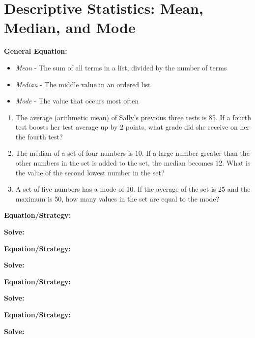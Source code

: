 \section{Descriptive Statistics: Mean, Median, and Mode}

\textbf{General Equation:}

\begin{itemize}[label=]
\item \textit{Mean} - The sum of all terms in a list, divided by the number of terms
\item \textit{Median} - The middle value in an ordered list
\item \textit{Mode} - The value that occurs most often
\end{itemize}

\begin{enumerate}[labelindent=*,style=multiline,leftmargin=*,label=\textbf{Example \arabic*:}]
\item The average (arithmetic mean) of Sally's previous three tests is 85. If a fourth test boosts her test average up by 2 points, what grade did she receive on her the fourth test?
\vfill\item The median of a set of four numbers is 10. If a large number greater than the other numbers in the set is added to the set, the median becomes 12. What is the value of the second lowest number in the set?
\vfill\item A set of five numbers has a mode of 10. If the average of the set is 25 and the maximum is 50, how many values in the set are equal to the mode?
\end{enumerate}

\vfill
\newpage
\begin{multicols*}{2}
\begin{outline}[enumerate]
\medium

\1 

\bigskip
\textbf{Equation/Strategy:} \hrulefill

\bigskip
\textbf{Solve:}

\vfill
\2 
\2 
\2 
\2 
\2 

\midline

\1 

\bigskip
\textbf{Equation/Strategy:} \hrulefill

\bigskip
\textbf{Solve:}

\vfill
\2 
\2 
\2 
\2 
\2 

\columnbreak
\advanced

\1 

\bigskip
\textbf{Equation/Strategy:} \hrulefill

\bigskip
\textbf{Solve:}

\vfill
\2 
\2 
\2 
\2 
\2 

\midline

\1 

\bigskip
\textbf{Equation/Strategy:}

\bigskip
\textbf{Solve:}

\vfill
\2
\2
\2
\2
\2
\end{outline}
\end{multicols*}